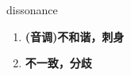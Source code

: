 
\begin{frame}
{\huge dissonance}
\begin{center}
\begin{enumerate}\Large
  \item \textbf{(音调)不和谐，刺身}
  \item \textbf{不一致，分歧}
\end{enumerate}
\end{center}
\end{frame}
